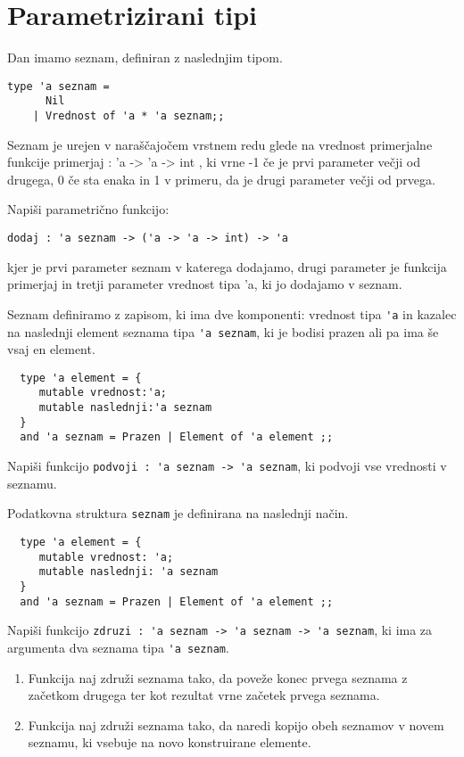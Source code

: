 \section{Parametrizirani tipi}
\begin{ex}
Dan imamo seznam, definiran z naslednjim tipom. 
\begin{lstlisting}
type 'a seznam = 
      Nil 
    | Vrednost of 'a * 'a seznam;; 
\end{lstlisting}

Seznam je urejen v nara\v s\v cajo\v cem vrstnem redu glede na vrednost primerjalne funkcije primerjaj : 'a -> 'a -> int , ki vrne -1 \v ce je prvi parameter ve\v cji od drugega, 0 \v ce sta enaka in 1 v primeru, da je drugi parameter ve\v cji od prvega.

Napi\v si parametri\v cno funkcijo:
\begin{lstlisting}
dodaj : 'a seznam -> ('a -> 'a -> int) -> 'a
\end{lstlisting}
kjer je prvi parameter seznam v katerega dodajamo, drugi parameter je funkcija primerjaj in tretji parameter vrednost tipa 'a, ki jo dodajamo v seznam.



\end{ex}
\begin{ex}
  Seznam definiramo z zapisom, ki ima dve komponenti: vrednost tipa
  \lstinline{'a} in kazalec na naslednji element seznama tipa \lstinline{'a seznam}, ki je bodisi prazen ali pa ima še vsaj en element.

  \begin{lstlisting}
  type 'a element = { 
     mutable vrednost:'a; 
     mutable naslednji:'a seznam 
  }
  and 'a seznam = Prazen | Element of 'a element ;;
  \end{lstlisting}

  Napi\v si funkcijo \lstinline{podvoji : 'a seznam -> 'a seznam}, ki
  podvoji vse vrednosti v seznamu.


\end{ex} 
\begin{ex}
  Podatkovna struktura \lstinline{seznam} je definirana na naslednji na\v
  cin.

  \begin{lstlisting}
  type 'a element = { 
     mutable vrednost: 'a; 
     mutable naslednji: 'a seznam 
  }
  and 'a seznam = Prazen | Element of 'a element ;;
  \end{lstlisting}

  Napi\v si funkcijo 
  \lstinline{zdruzi : 'a seznam -> 'a seznam -> 'a seznam}, ki ima za argumenta dva seznama tipa \lstinline{'a seznam}.

  \begin{enumerate}[label=(\roman*)]
  \item Funkcija naj zdru\v zi seznama tako, da pove\v ze konec prvega
    seznama z za\v cetkom drugega ter kot rezultat vrne za\v cetek prvega
    seznama.

  \item Funkcija naj zdru\v zi seznama tako, da naredi kopijo obeh
    seznamov v novem seznamu, ki vsebuje na novo konstruirane
    elemente.
  \end{enumerate}


\end{ex} 
